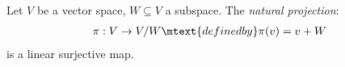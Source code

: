         \begin{center}
        \end{center}

    \begin{example}
        Let $V$ be a vector space, $W \subseteq V$ a subspace. The \textit{natural projection}:
            \begin{equation*}
            \begin{split}
                \pi:V \rightarrow V/W \mtext{defined by}\pi(v) = v+W
            \end{split}
            \end{equation*}
        is a linear surjective map.
    \end{example}

